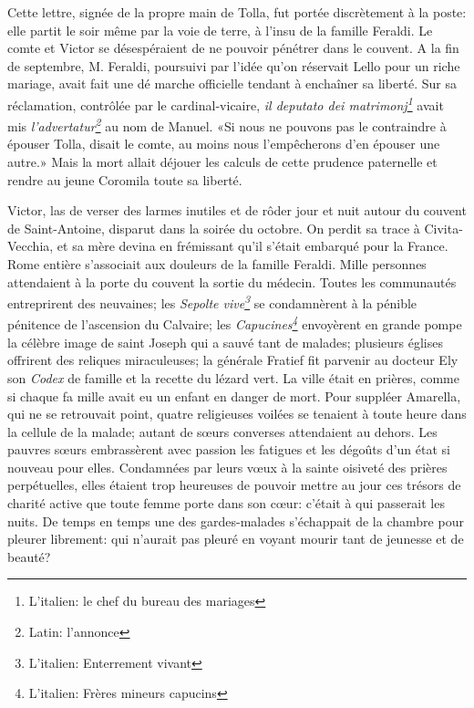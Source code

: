 Cette lettre, signée de la propre main de Tolla, fut portée discrètement à la poste: elle partit le soir même par la voie de terre, à l'insu de la famille Feraldi. Le comte et Victor se désespéraient de ne pouvoir pénétrer dans le couvent. A la fin de septembre, M. Feraldi, poursuivi par l'idée qu'on réservait Lello pour un riche mariage, avait fait une dé marche officielle tendant à enchaîner sa liberté. Sur sa réclamation, contrôlée par le cardinal-vicaire, \emph{il deputato dei matrimonj\footnote{
L'italien: le chef du bureau des mariages
}} avait mis \emph{l'advertatur\footnote{
Latin: l'annonce
}} au nom de Manuel. «Si nous ne pouvons pas le contraindre à épouser Tolla, disait le comte, au moins nous l'empêcherons d'en épouser une autre.» Mais la mort allait déjouer les calculs de cette prudence paternelle et rendre au jeune Coromila toute sa liberté.

Victor, las de verser des larmes inutiles et de rôder jour et nuit autour du couvent de Saint-Antoine, disparut dans la soirée du  octobre. On perdit sa trace à Civita-Vecchia, et sa mère devina en frémissant qu'il s'était embarqué pour la France. Rome entière s'associait aux douleurs de la famille Feraldi. Mille personnes attendaient à la porte du couvent la sortie du médecin. Toutes les communautés entreprirent des neuvaines; les \emph{Sepolte vive\footnote{
L'italien: Enterrement vivant
}} se condamnèrent à la pénible pénitence de l'ascension du Calvaire; les \emph{Capucines\footnote{
L'italien: Frères mineurs capucins
}} envoyèrent en grande pompe la célèbre image de saint Joseph qui a sauvé tant de malades; plusieurs églises offrirent des reliques miraculeuses; la générale Fratief fit parvenir au docteur Ely son \emph{Codex} de famille et la recette du lézard vert. La ville était en prières, comme si chaque fa mille avait eu un enfant en danger de mort. Pour suppléer Amarella, qui ne se retrouvait point, quatre religieuses voilées se tenaient à toute heure dans la cellule de la malade; autant de s\oe{}urs converses attendaient au dehors. Les pauvres s\oe{}urs embrassèrent avec passion les fatigues et les dégoûts d'un état si nouveau pour elles. Condamnées par leurs v\oe{}ux à la sainte oisiveté des prières perpétuelles, elles étaient trop heureuses de pouvoir mettre au jour ces trésors de charité active que toute femme porte dans son c\oe{}ur: c'était à qui passerait les nuits. De temps en temps une des gardes-malades s'échappait de la chambre pour pleurer librement: qui n'aurait pas pleuré en voyant mourir tant de jeunesse et de beauté?

